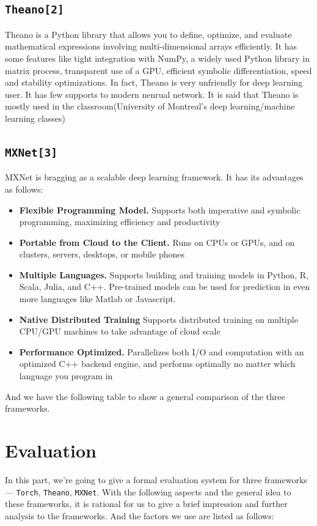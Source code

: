 \documentclass[12pt]{article}
\begin{document}
\subsection{\texttt{Theano[2]}}
Theano is a Python library that allows you to define, optimize, and evaluate mathematical expressions involving multi-dimensional arrays efficiently. It has some features like tight integration with NumPy, a widely used Python library in matrix process, transparent use of a GPU, efficient symbolic differentiation, speed and stability optimizations. In fact, Theano is very unfriendly for deep learning user. It has few supports to modern nenrual network. It is said that Theano is mostly used in the classroom(University of Montreal’s deep learning/machine learning classes)
\subsection{\texttt{MXNet[3]}}
MXNet is bragging as a scalable deep learning framework. It has its advantages as follows:
\begin{itemize}	
	\item {\bf Flexible Programming Model.} Supports both imperative and symbolic programming, maximizing efficiency and productivity
	\item {\bf Portable from Cloud to the Client.} Runs on CPUs or GPUs, and on clusters, servers, desktops, or mobile phones 
	\item {\bf Multiple Languages.} Supports building and training models in Python, R, Scala, Julia, and C++. Pre-trained models can be used for prediction in even more languages like Matlab or Javascript.
	\item {\bf Native Distributed Training} Supports distributed training on multiple CPU/GPU machines to take advantage of cloud scale
	\item {\bf Performance Optimized.} Parallelizes both I/O and computation with an optimized C++ backend engine, and performs optimally no matter which language you program in
\end{itemize}
And we have the following table to show a general comparison of the three frameworks.


\section{Evaluation}
In this part, we're going to give a formal evaluation system for three frameworks --- \texttt{Torch}, \texttt{Theano}, \texttt{MXNet}. With the following aspects and the general idea to these frameworks, it is rational for us to give a brief impression and further analysis to the frameworks. And the factors we use are listed as follows:
\end{document}
